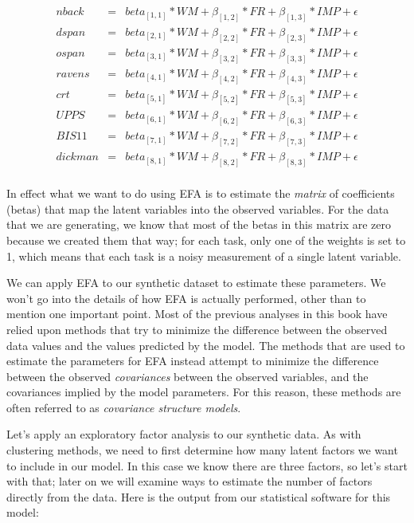 \documentclass[
  12pt,
]{book}
\begin{document}
\[
\begin{array}{lcl}
nback & = &beta_{[1, 1]} * WM + \beta_{[1, 2]} * FR + \beta_{[1, 3]} * IMP  + \epsilon \\
dspan & = &beta_{[2, 1]} * WM + \beta_{[2, 2]} * FR + \beta_{[2, 3]} * IMP  + \epsilon \\
ospan & = &beta_{[3, 1]} * WM + \beta_{[3, 2]} * FR + \beta_{[3, 3]} * IMP  + \epsilon \\
ravens & = &beta_{[4, 1]} * WM + \beta_{[4, 2]} * FR + \beta_{[4, 3]} * IMP   + \epsilon \\
crt & = &beta_{[5, 1]} * WM + \beta_{[5, 2]} * FR + \beta_{[5, 3]} * IMP   + \epsilon \\
UPPS & = &beta_{[6, 1]} * WM + \beta_{[6, 2]} * FR + \beta_{[6, 3]} * IMP   + \epsilon \\
BIS11 & = &beta_{[7, 1]} * WM + \beta_{[7, 2]} * FR + \beta_{[7, 3]} * IMP  + \epsilon \\
dickman & = &beta_{[8, 1]} * WM + \beta_{[8, 2]} * FR + \beta_{[8, 3]} * IMP   + \epsilon \\
\end{array}
\]

In effect what we want to do using EFA is to estimate the \emph{matrix} of coefficients (betas) that map the latent variables into the observed variables. For the data that we are generating, we know that most of the betas in this matrix are zero because we created them that way; for each task, only one of the weights is set to 1, which means that each task is a noisy measurement of a single latent variable.

We can apply EFA to our synthetic dataset to estimate these parameters. We won't go into the details of how EFA is actually performed, other than to mention one important point. Most of the previous analyses in this book have relied upon methods that try to minimize the difference between the observed data values and the values predicted by the model. The methods that are used to estimate the parameters for EFA instead attempt to minimize the difference between the observed \emph{covariances} between the observed variables, and the covariances implied by the model parameters. For this reason, these methods are often referred to as \emph{covariance structure models}.

Let's apply an exploratory factor analysis to our synthetic data. As with clustering methods, we need to first determine how many latent factors we want to include in our model. In this case we know there are three factors, so let's start with that; later on we will examine ways to estimate the number of factors directly from the data. Here is the output from our statistical software for this model:
\end{document}
